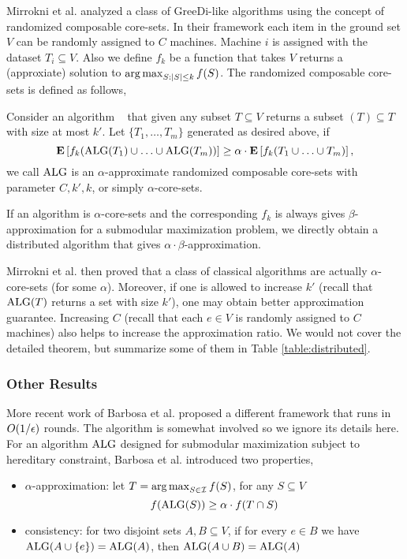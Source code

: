 Mirrokni et al. \cite{MZ15} analyzed a class of {\sc GreeDi}-like algorithms using the concept of randomized composable core-sets. In their framework each item in the ground set $V$ can be randomly assigned to $C$ machines. Machine $i$ is assigned with the dataset $T_i \subseteq V$. Also we define $f_k$ be a function that takes $V$ returns a (approxiate) solution to $\operatorname*{arg\,max}_{S:|S|\leq k} f(S)$. The randomized composable core-sets is defined as follows,
\begin{definition}[Informal]
  \label{def:core-sets}
  Consider an algorithm \alg~ that given any subset $T\subseteq V$ returns a subset \alg$(T)\subseteq T$ with size at most $k'$. Let $\{T_1, \ldots, T_m\}$ generated as desired above, if 
$$\mathbf{E}\left[f_k(\text{ALG}(T_1)\cup\ldots\cup\text{ALG}(T_m))\right] \geq \alpha \cdot \mathbf{E}\left[f_k(T_1\cup\ldots\cup T_m)\right],$$
we call $\text{ALG}$ is an $\alpha$-approximate randomized composable core-sets with parameter $C, k', k$, or simply $\alpha$-core-sets.
\end{definition}
If an algorithm is $\alpha$-core-sets and the corresponding $f_k$ is always gives $\beta$-approximation for a submodular maximization problem, we directly obtain a distributed algorithm that gives $\alpha\cdot\beta$-approximation.



Mirrokni et al. \cite{MZ15} then proved that a class of classical algorithms are actually $\alpha$-core-sets (for some $\alpha$). Moreover, if one is allowed to increase $k'$ (recall that $\text{ALG}(T)$ returns a set with size $k'$), one may obtain better approximation guarantee. Increasing $C$ (recall that each $e\in V$ is randomly assigned to $C$ machines) also helps to increase the approximation ratio. We would not cover the detailed theorem, but summarize some of them in Table \ref{table:distributed}.

\subsubsection{Other Results}
More recent work of Barbosa et al. \cite{BAN+2015new} proposed a different framework that runs in $O(1/\epsilon)$ rounds. The algorithm is somewhat involved so we ignore its details here. For an algorithm $\text{ALG}$ designed for submodular maximization subject to hereditary constraint, Barbosa et al. \cite{BAN+2015new} introduced two properties,
\begin{itemize}
\item $\alpha$-approximation: let $T = \operatorname*{arg\,max}_{S\in\mathcal{I}} f(S)$, for any $S \subseteq V$
$$f(\text{ALG}(S)) \geq \alpha \cdot f(T\cap S)$$
\item consistency: for two disjoint sets $A, B \subseteq V$, if for every $e\in B$ we have $\text{ALG}(A\cup\{e\}) = \text{ALG}(A)$, then $\text{ALG}(A\cup B) = \text{ALG}(A)$
\end{itemize}


